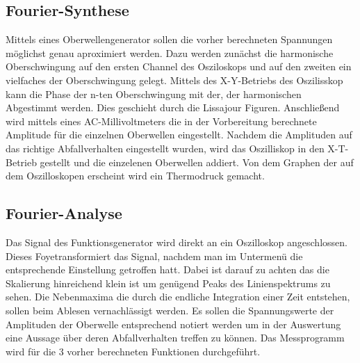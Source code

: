 \subsection{Fourier-Synthese}
Mittels eines Oberwellengenerator sollen die vorher berechneten Spannungen möglichst genau aproximiert werden. Dazu werden zunächst die harmonische Oberschwingung auf den ersten Channel des Osziloskops und auf den zweiten ein vielfaches der Oberschwingung gelegt. Mittels des X-Y-Betriebs des Oszilisskop kann die Phase der n-ten Oberschwingung mit der, der harmonischen Abgestimmt werden. Dies geschieht durch die Lissajour Figuren. Anschließend wird mittels eines AC-Millivoltmeters die in der Vorbereitung berechnete Amplitude für die einzelnen Oberwellen eingestellt. Nachdem die Amplituden auf das richtige Abfallverhalten eingestellt wurden, wird das Oszilliskop in den X-T-Betrieb gestellt und die einzelenen Oberwellen addiert. Von dem Graphen der auf dem Oszilloskopen erscheint wird ein Thermodruck gemacht.
\subsection{Fourier-Analyse}
Das Signal des Funktionsgenerator wird direkt an ein Oszilloskop angeschlossen. Dieses Foyetransformiert das Signal, nachdem man im Untermenü die entsprechende Einstellung getroffen hatt. Dabei ist darauf zu achten das die Skalierung hinreichend klein ist um genügend Peaks des Linienspektrums zu sehen. Die Nebenmaxima die durch die endliche Integration einer Zeit entstehen, sollen beim Ablesen vernachlässigt werden. Es sollen die Spannungswerte der Amplituden der Oberwelle entsprechend notiert werden um in der Auswertung eine Aussage über deren Abfallverhalten treffen zu können. Das Messprogramm wird für die 3 vorher berechneten Funktionen durchgeführt.
